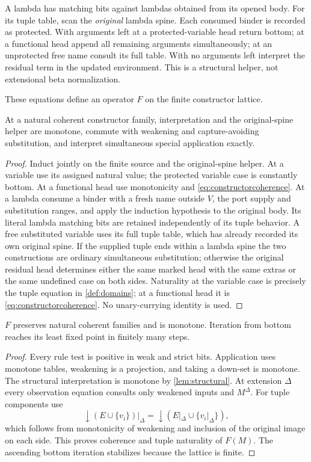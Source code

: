 \documentclass[11pt,a4paper]{article}
\begin{document}
A lambda has matching bits against lambdas obtained from its opened body.
For its tuple table, scan the \emph{original} lambda spine.  Each consumed
binder is recorded as protected.  With arguments left at a protected-variable
head return bottom; at a functional head append all remaining arguments
simultaneously; at an unprotected free name consult its full table.
With no arguments left interpret the residual term in the updated environment.
This is a structural helper, not extensional beta normalization.

These equations define an operator $F$ on the finite constructor lattice.
\begin{lemma}\label{lem:structural}
At a natural coherent constructor family, interpretation and the original-spine
helper are monotone, commute with weakening and capture-avoiding substitution,
and interpret simultaneous special application exactly.
\end{lemma}
\begin{proof}
Induct jointly on the finite source and the original-spine helper.
At a variable use its assigned natural value; the protected variable case is
constantly bottom.  At a functional head use monotonicity and
\eqref{eq:constructorcoherence}.  At a lambda consume a binder with a fresh
name outside $V$, the port supply and substitution ranges, and apply the
induction hypothesis to the original body.  Its literal lambda matching bits
are retained independently of its tuple behavior.  A free substituted variable
uses its full tuple table, which has already recorded its own original spine.
If the supplied tuple ends within a lambda spine the two constructions are
ordinary simultaneous substitution; otherwise the original residual head
determines either the same marked head with the same extras or the same
undefined case on both sides.  Naturality at the variable case is precisely
the tuple equation in \ref{def:domains}; at a functional head it is
\eqref{eq:constructorcoherence}.  No unary-currying identity is used.
\end{proof}

\begin{lemma}\label{lem:operator}
$F$ preserves natural coherent families and is monotone.  Iteration from
bottom reaches its least fixed point in finitely many steps.
\end{lemma}
\begin{proof}
Every rule test is positive in weak and strict bits.  Application uses monotone
tables, weakening is a projection, and taking a down-set is monotone.
The structural interpretation is monotone by \ref{lem:structural}.
At extension $\Delta$ every observation equation consults only weakened
inputs and $M^\Delta$.  For tuple components use
\[
 {\downarrow}(E\cup\{v_i\})|_\Delta
 ={\downarrow}(E|_\Delta\cup\{v_i|_\Delta\}),
\]
which follows from monotonicity of weakening and inclusion of the original
image on each side.  This proves coherence and tuple naturality of $F(M)$.
The ascending bottom iteration stabilizes because the lattice is finite.
\end{proof}
\end{document}
